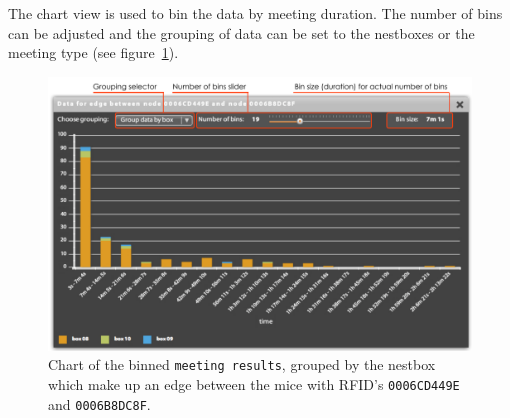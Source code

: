 The chart view is used to bin the data by meeting duration. The number of bins can be adjusted and the grouping of data can be set to the nestboxes or the meeting type (see figure~\ref{fig:edge_data_panel_chart}).

\begin{figure}[!htpb]
\begin{center}
  \includegraphics[width=\textwidth]{assets/pdf/edge_data_panel_chart.pdf}
  \caption[Edge data chart]{Chart of the binned \lstinline|meeting results|, grouped by the nestbox which make up an edge between the mice with RFID's \lstinline|0006CD449E| and \lstinline|0006B8DC8F|.}
  \label{fig:edge_data_panel_chart}
\end{center}
\end{figure}   
